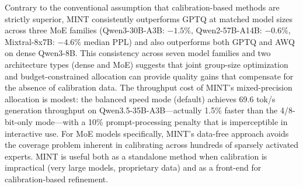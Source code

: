 \documentclass{article}
\begin{document}
Contrary to the conventional assumption that calibration-based methods are strictly superior, MINT consistently outperforms GPTQ at matched model sizes across three MoE families (Qwen3-30B-A3B: $-1.5\%$, Qwen2-57B-A14B: $-0.6\%$, Mixtral-8x7B: $-4.6\%$ median PPL) and also outperforms both GPTQ and AWQ on dense Qwen3-8B. This consistency across seven model families and two architecture types (dense and MoE) suggests that joint group-size optimization and budget-constrained allocation can provide quality gains that compensate for the absence of calibration data. The throughput cost of MINT's mixed-precision allocation is modest: the balanced speed mode (default) achieves 69.6 tok/s generation throughput on Qwen3.5-35B-A3B---actually 1.5\% faster than the 4/8-bit-only mode---with a 10\% prompt-processing penalty that is imperceptible in interactive use. For MoE models specifically, MINT's data-free approach avoids the coverage problem inherent in calibrating across hundreds of sparsely activated experts. MINT is useful both as a standalone method when calibration is impractical (very large models, proprietary data) and as a front-end for calibration-based refinement.



\end{document}
